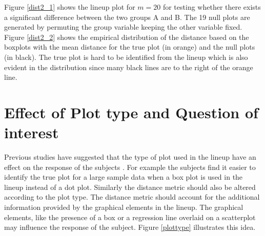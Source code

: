 \documentclass[12]{article}
\begin{document}
Figure \ref{dist2_1} shows the lineup plot for $m = 20$ for testing whether there exists a significant difference between the two groups A and B. The 19 null plots are generated by permuting the group variable keeping the other variable fixed. Figure \ref{dist2_2} shows the empirical distribution of the distance based on the boxplots with the mean distance for the true plot (in orange) and the null plots (in black). The true plot is hard to be identified from the lineup which is also evident in the distribution since many black lines are to the right of the orange line.

\section{Effect of Plot type and Question of interest } \label{sec:plot_type}

Previous studies have suggested that the type of plot used in the lineup have an effect on the response of the subjects \citep{zhao:2012}. For example the subjects find it easier to identify the true plot for a large sample data when a box plot is used in the lineup instead of a dot plot. Similarly the distance metric should also be altered according to the plot type. The distance metric should account for the additional information provided by the graphical elements in the lineup. The graphical elements, like the presence of a box or a regression line overlaid on a scatterplot may influence the response of the subject. Figure \ref{plottype} illustrates this idea. 
\end{document}
